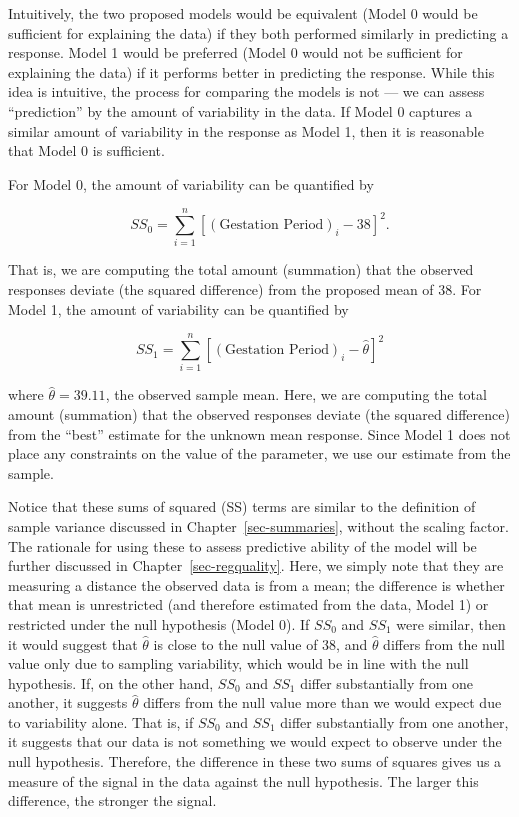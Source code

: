 \documentclass[
  letterpaper,
  DIV=11,
  numbers=noendperiod]{scrreprt}
\theoremstyle{definition}
\theoremstyle{definition}
\theoremstyle{plain}
\theoremstyle{remark}
\begin{document}
Intuitively, the two proposed models would be equivalent (Model 0 would
be sufficient for explaining the data) if they both performed similarly
in predicting a response. Model 1 would be preferred (Model 0 would not
be sufficient for explaining the data) if it performs better in
predicting the response. While this idea is intuitive, the process for
comparing the models is not --- we can assess ``prediction'' by the
amount of variability in the data. If Model 0 captures a similar amount
of variability in the response as Model 1, then it is reasonable that
Model 0 is sufficient.

For Model 0, the amount of variability can be quantified by

\[SS_0 = \sum_{i=1}^{n} \left[(\text{Gestation Period})_i - 38\right]^2.\]

That is, we are computing the total amount (summation) that the observed
responses deviate (the squared difference) from the proposed mean of 38.
For Model 1, the amount of variability can be quantified by

\[SS_1 = \sum_{i=1}^{n} \left[(\text{Gestation Period})_i - \widehat{\theta}\right]^2\]

where \(\widehat{\theta} = 39.11\), the observed sample mean. Here, we
are computing the total amount (summation) that the observed responses
deviate (the squared difference) from the ``best'' estimate for the
unknown mean response. Since Model 1 does not place any constraints on
the value of the parameter, we use our estimate from the sample.

Notice that these sums of squared (SS) terms are similar to the
definition of sample variance discussed in Chapter~\ref{sec-summaries},
without the scaling factor. The rationale for using these to assess
predictive ability of the model will be further discussed in
Chapter~\ref{sec-regquality}. Here, we simply note that they are
measuring a distance the observed data is from a mean; the difference is
whether that mean is unrestricted (and therefore estimated from the
data, Model 1) or restricted under the null hypothesis (Model 0). If
\(SS_0\) and \(SS_1\) were similar, then it would suggest that
\(\widehat{\theta}\) is close to the null value of 38, and
\(\widehat{\theta}\) differs from the null value only due to sampling
variability, which would be in line with the null hypothesis. If, on the
other hand, \(SS_0\) and \(SS_1\) differ substantially from one another,
it suggests \(\widehat{\theta}\) differs from the null value more than
we would expect due to variability alone. That is, if \(SS_0\) and
\(SS_1\) differ substantially from one another, it suggests that our
data is not something we would expect to observe under the null
hypothesis. Therefore, the difference in these two sums of squares gives
us a measure of the signal in the data against the null hypothesis. The
larger this difference, the stronger the signal.
\end{document}
